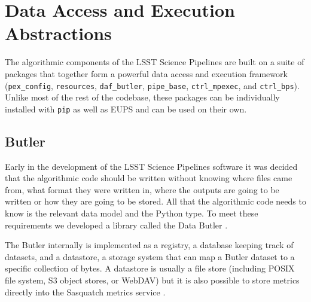 \section{Data Access and Execution Abstractions}
\label{sec:middleware}

The algorithmic components of the LSST Science Pipelines are built on a suite of packages that together form a powerful data access and execution framework (\texttt{pex\_config}, \texttt{resources}, \texttt{daf\_butler}, \texttt{pipe\_base}, \texttt{ctrl\_mpexec}, and \texttt{ctrl\_bps}).
Unlike most of the rest of the codebase, these packages can be individually installed with \texttt{pip} as well as EUPS and can be used on their own.

\subsection{Butler}

Early in the development of the LSST Science Pipelines software it was decided that the algorithmic code should be written without knowing where files came from, what format they were written in, where the outputs are going to be written or how they are going to be stored.
All that the algorithmic code needs to know is the relevant data model and the Python type.
To meet these requirements we developed a library called the Data Butler \citep[see e.g.,][]{2022SPIE12189E..11J,2023arXiv230303313L}.

The Butler internally is implemented as a registry, a database keeping track of datasets, and a datastore, a storage system that can map a Butler dataset to a specific collection of bytes.
A datastore is usually a file store (including POSIX file system, S3 object stores, or WebDAV) but it is also possible to store metrics directly into the Sasquatch metrics service \citep{SQR-068,2024SPIE13101E..1MF}.


